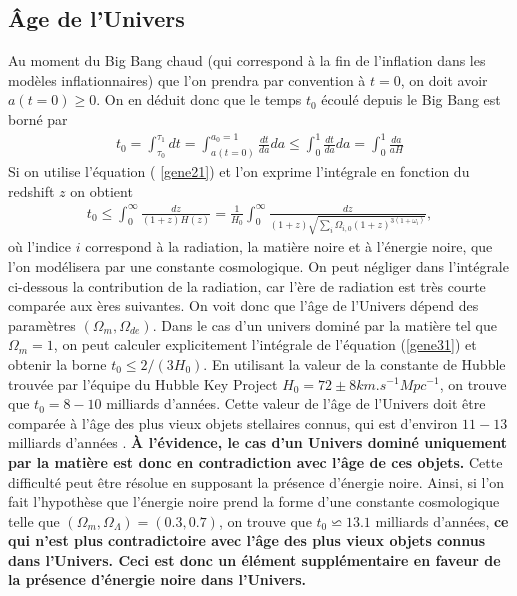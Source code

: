 \documentclass[a4paper,12pt]{report}
\theoremstyle{plain}
\theoremstyle{plain}
\begin{document}
 \subsection{ \^Age de l'Univers }
 Au moment du Big Bang chaud (qui correspond \`a la fin de l'inflation dans les mod\`eles
inflationnaires) que l'on prendra par convention \`a $ t = 0$, on doit avoir  $ a(t = 0) \geqslant 0 $. On en
d\'eduit donc que le temps $t_0$ \'ecoul\'e depuis le Big Bang est born\'e par
\begin{eqnarray}
 t_0 = \int_{\tau_0}^{\tau_1} dt = \int_{a(t=0)}^{a_0 = 1} \frac{dt}{ da} da \leqslant \int_{0}^{ 1} \frac{dt}{ da} da =
 \int_{0}^{ 1} \frac{da}{ aH}   \label{gene30}
\end{eqnarray}
Si on utilise l'\'equation ( \ref{gene21}) et l'on exprime l'int\'egrale en fonction du redshift $z$ on obtient
\begin{eqnarray}
 t_0 \leqslant \int_{0}^{\infty } \frac{dz}{(1 + z)H(z) } = \frac{1}{H_0}
 \int_0^{\infty} \frac{dz}{ (1 + z) \sqrt{ \sum_{i}  \Omega_{i,0}(1+z)^{3(1 + \omega_i) }}}, \label{gene31}
\end{eqnarray}
o\`u l'indice $i$ correspond \`a la radiation, la mati\`ere noire et \`a l'\'energie noire, que l'on 
mod\'elisera par une constante cosmologique. On peut n\'egliger dans l'int\'egrale ci-dessous la
contribution de la radiation, car l'\`ere de radiation est tr\`es courte compar\'ee aux \`eres 
suivantes. On voit donc que l'\^age de l'Univers d\'epend des param\`etres $(\Omega_m, \Omega_{de} )$. Dans le cas
d'un univers domin\'e par la mati\`ere tel que $\Omega_m = 1$, on peut calculer explicitement 
l'int\'egrale de l'\'equation (\ref{gene31}) et obtenir la borne $ t_0 \leqslant 2 /(3H_0)$. En utilisant la valeur de la
constante de Hubble trouv\'ee par l'\'equipe du Hubble Key Project \cite{126} $ H_0 = 72 \pm 8 km.s^{-1} Mpc^{-1} $,
 on trouve que $t_0 = 8 − 10 $ milliards d'ann\'ees. Cette valeur de l'\^age de l'Univers
doit \^etre compar\'ee \`a l'\^age des plus vieux objets stellaires connus, qui est d'environ $ 11 − 13$
milliards d'ann\'ees \cite{143, 163, 223}. {\bf  \`A l'\'evidence, le cas d'un Univers domin\'e uniquement par
 la mati\`ere est donc en contradiction avec l'\^age de ces objets.} Cette difficult\'e peut \^etre
r\'esolue en supposant la pr\'esence d'\'energie noire. Ainsi, si l'on fait l'hypoth\`ese que 
l'\'energie noire prend la forme d'une constante cosmologique telle que $(\Omega_m, \Omega_{\Lambda} ) = (0.3, 0.7)$, on
trouve que  $ t_0 \backsimeq 13.1$ milliards d'ann\'ees, {\bf ce qui n'est plus contradictoire avec l'\^age des plus
vieux objets connus dans l'Univers. Ceci est donc un \'el\'ement suppl\'ementaire en faveur de
la pr\'esence d'\'energie noire dans l'Univers.}
 
\end{document}
